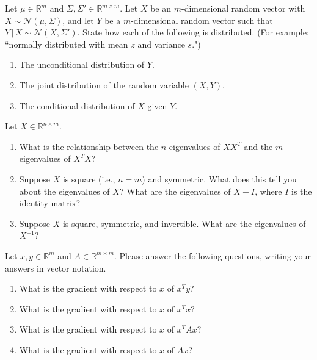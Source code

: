 \documentclass{harvardml}
\newcommand{\given}{\,|\,}
\newcommand{\R}{\mathbb{R}}
\begin{document}
\begin{problem}
Let $\mu \in \R^m$ and $\Sigma, \Sigma' \in \R^{m \times m}$. Let $X$ be an $m$-dimensional random vector with $X \sim \mathcal{N}(\mu, \Sigma)$, and let $Y$ be a $m$-dimensional random vector such that $Y \given X \sim \mathcal{N}(X, \Sigma')$. State how each of the following is distributed. (For example: ``normally distributed with mean $z$ and variance $s$.")
\begin{enumerate}[label=(\alph*)]
  \item The unconditional distribution of $Y$.
  \item The joint distribution of the random variable $(X,Y)$.
  \item The conditional distribution of $X$ given $Y$.
\end{enumerate}
\end{problem}


\begin{problem}
Let $X \in \R^{n \times m}$.
\begin{enumerate}[label=(\alph*)]
\item What is the relationship between the $n$ eigenvalues of $XX^T$ and the $m$ eigenvalues of $X^TX$?
\item Suppose $X$ is square (i.e., $n=m$) and symmetric. What does this tell you about the eigenvalues of $X$? What are the eigenvalues of $X + I$, where $I$ is the identity matrix?
\item Suppose $X$ is square, symmetric, and invertible. What are the eigenvalues of $X^{-1}$?
\end{enumerate}
\end{problem}


\begin{problem}[Calculus]
Let $x, y \in \R^m$ and $A \in \R^{m \times m}$. Please answer the following questions, writing your answers in vector notation.
\begin{enumerate}[label=(\alph*)]
\item What is the gradient with respect to $x$ of $x^T y$?
\item What is the gradient with respect to $x$ of $x^T x$?
\item What is the gradient with respect to $x$ of $x^T A x$?
\item What is the gradient with respect to $x$ of $A x$?
\end{enumerate}
\end{problem}
\end{document}
